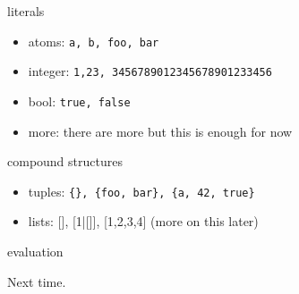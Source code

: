 \begin{frame}{literals}
 \begin{itemize}
  \pause \item {atoms:} {\tt a, b, foo, bar}
  \pause \item {integer:} {\tt 1,23, 3456789012345678901233456}
  \pause \item {bool:} {\tt true, false}
  \pause \item {more:} there are more but this is enough for now
 \end{itemize}
\end{frame}


\begin{frame}{compound structures}
 \begin{itemize}
  \pause \item {tuples:} {\tt \{\}, \{foo, bar\}, \{a, 42, true\}}
  \pause \item {lists:} [], [1|[]], [1,2,3,4]  (more on this later)
 \end{itemize}
\end{frame}

\begin{frame}{evaluation}

\pause
\vspace{100pt}\hspace{100pt}Next time.

\end{frame}



